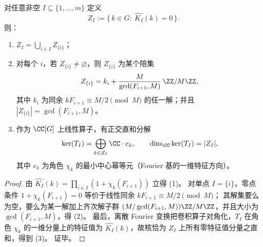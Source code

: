 \begin{proposition}\label{prop:fold-fiber-convolution-kernel-zero-spectrum}
对任意非空 \(I\subseteq\{1,\dots,m\}\) 定义
\[
Z_I:=\{\,k\in G:\ \widehat{K_I}(k)=0\,\}.
\]
则：
\begin{enumerate}
\normalfont
  \item \(Z_I=\bigcup_{i\in I}Z_{\{i\}}\)；
  \item 对每个 \(i\)，若 \(Z_{\{i\}}\neq\varnothing\)，则 \(Z_{\{i\}}\) 为某个陪集
  \[
  Z_{\{i\}}=k_i+\frac{M}{\gcd(F_{i+1},M)}\,\ZZ/M\ZZ,
  \]
  其中 \(k_i\) 为同余 \(kF_{i+1}\equiv M/2\pmod M\) 的任一解；并且 \(|Z_{\{i\}}|=\gcd(F_{i+1},M)\)。
  \item 作为 \(\CC[G]\) 上线性算子，有正交直和分解
  \[
  \ker(T_I)=\bigoplus_{k\in Z_I}\CC\cdot e_k,
  \qquad
  \dim_{\CC}\ker(T_I)=|Z_I|,
  \]
  其中 \(e_k\) 为角色 \(\chi_k\) 的最小中心幂等元（Fourier 基的一维特征方向）。
\end{enumerate}
\end{proposition}
\begin{proof}
由 \(\widehat{K_I}(k)=\prod_{i\in I}(1+\chi_k(F_{i+1}))\) 立得 (1)。
对单点 \(I=\{i\}\)，零点条件 \(1+\chi_k(F_{i+1})=0\) 等价于线性同余 \(kF_{i+1}\equiv M/2\pmod M\)；
其解集要么为空，要么为某一解加上齐次解子群 \((M/\gcd(F_{i+1},M))\ZZ/M\ZZ\)，并且大小为 \(\gcd(F_{i+1},M)\)，得 (2)。
最后，离散 Fourier 变换把卷积算子对角化，\(T_I\) 在角色 \(\chi_k\) 的一维分量上的特征值为 \(\widehat{K_I}(k)\)，故核恰为 \(Z_I\) 上所有零特征值分量之直和，得到 (3)。
证毕。
\end{proof}

